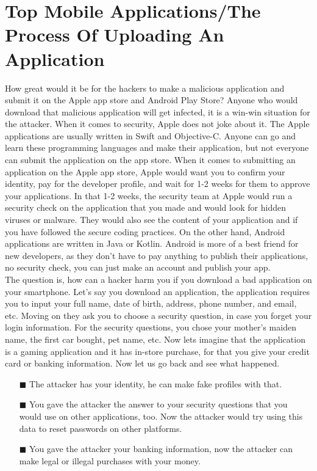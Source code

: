 \documentclass{article}
\begin{document}
\section{Top Mobile Applications/The Process Of Uploading An Application}
How great would it be for the hackers to make a malicious application and submit it on the Apple app store and Android Play Store? Anyone who would download that malicious application will get infected, it is a win-win situation for the attacker. When it comes to security, Apple does not joke about it. The Apple applications are usually written in Swift and Objective-C. Anyone can go and learn these programming languages and make their application, but not everyone can submit the application on the app store. When it comes to submitting an application on the Apple app store, Apple would want you to confirm your identity, pay for the developer profile, and wait for 1-2 weeks for them to approve your applications. In that 1-2 weeks, the security team at Apple would run a security check on the application that you made and would look for hidden viruses or malware. They would also see the content of your application and if you have followed the secure coding practices. On the other hand, Android applications are written in Java or Kotlin. Android is more of a best friend for new developers, as they don’t have to pay anything to publish their applications, no security check, you can just make an account and publish your app.\\
The question is, how can a hacker harm you if you download a bad application on your smartphone. Let's say you download an application, the application requires you to input your full name, date of birth, address, phone number, and email, etc. Moving on they ask you to choose a security question, in case you forget your login information. For the security questions, you chose your mother’s maiden name, the first car bought, pet name, etc. Now lets imagine that the application is a gaming application and it has in-store purchase, for that you give your credit card or banking information. Now let us go back and see what happened.

 \begin{itemize}
   \item[$\blacksquare$] The attacker has your identity, he can make fake profiles with that.
   \item[$\blacksquare$] You gave the attacker the answer to your security questions that you would use on other applications, too. Now the attacker would try using this data to reset passwords on other platforms.
   \item[$\blacksquare$] You gave the attacker your banking information, now the attacker can make legal or illegal purchases with your money.
 \end{itemize}
\end{document}
